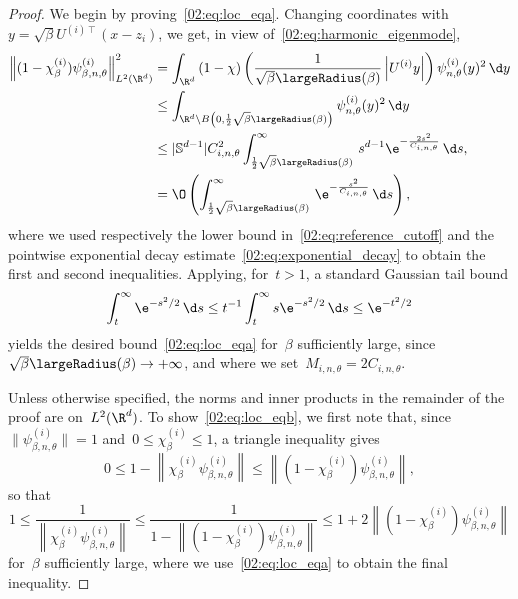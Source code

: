     \begin{proof}
        We begin by proving~\eqref{02:eq:loc_eqa}.
        Changing coordinates with~$y = \sqrt\beta U^{(i)\intercal}(x-z_i)$, we get, in view of~\eqref{02:eq:harmonic_eigenmode},
        \begin{equation}
            \begin{aligned}
                \left\|(1-\chi_\beta^{(i)})\psi_{\beta,n,\theta}^{(i)}\right\|^2_{L^2(\R^d)} &= \int_{\R^d}\left(1-\chi\right)\left(\frac1{\sqrt\beta\largeRadius(\beta)}\left|U^{(i)}y\right|\right)\psi^{(i)}_{n,\theta}(y)^2\,\d y\\
                &\leq \int_{\R^d\setminus B\left(0,\frac12 \sqrt\beta\largeRadius(\beta)\right)}\psi^{(i)}_{n,\theta}(y)^2\,\d y\\
                &\leq |\mathbb S^{d-1}|C_{i,n,\theta}^2\int_{\frac12 \sqrt\beta\largeRadius(\beta)}^\infty\,s^{d-1}\e^{-\frac{2s^2}{C_{i,n,\theta}}}\,\d s,\\
                &= \O\left(\int_{\frac12 \sqrt\beta\largeRadius(\beta)}^\infty\,\e^{-\frac{s^2}{C_{i,n,\theta}}}\,\d s\right),
            \end{aligned}
        \end{equation}
        where we used respectively the lower bound in~\eqref{02:eq:reference_cutoff} and the pointwise exponential decay estimate~\eqref{02:eq:exponential_decay} to obtain the first and second inequalities. Applying, for~$t>1$, a standard Gaussian tail bound
        $${\int_t^\infty \e^{-s^2/2}\,\d s \leq t^{-1}\int_t^\infty s\e^{-s^2/2}\,\d s \leq \e^{-t^2/2}}$$
        yields the desired bound~\eqref{02:eq:loc_eqa} for~$\beta$ sufficiently large, since~$\sqrt\beta\largeRadius(\beta)\to +\infty$, and where we set~$M_{i,n,\theta} = 2 C_{i,n,\theta}$.

        Unless otherwise specified, the norms and inner products in the remainder of the proof are on~$L^2(\R^d)$.
        To show~\eqref{02:eq:loc_eqb}, we first note that, since
       ~$\|\psi^{(i)}_{\beta,n,\theta}\|=1$ and~$0\leq \chi_\beta^{(i)}\leq 1$, a triangle inequality gives
        \[0\leq 1-\left\|\chi_\beta^{(i)}\psi^{(i)}_{\beta,n,\theta}\right\|\leq \left\|(1-\chi_\beta^{(i)})\psi^{(i)}_{\beta,n,\theta}\right\|,\]
        so that
        \begin{equation}
            \label{02:eq:lemme2_normalization}
            1\leq \frac1{\left\|\chi_\beta^{(i)}\psi^{(i)}_{\beta,n,\theta}\right\|} \leq \frac1{1-\left\|(1-\chi_\beta^{(i)})\psi^{(i)}_{\beta,n,\theta}\right\|}\leq 1 + 2\left\|(1-\chi_\beta^{(i)})\psi^{(i)}_{\beta,n,\theta}\right\|
        \end{equation}
        for~$\beta$ sufficiently large, where we use~\eqref{02:eq:loc_eqa} to obtain the final inequality.


\end{proof}
